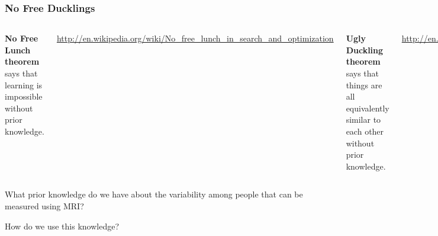 \begin{frame}
\frametitle{No Free Ducklings}
\begin{columns}[c]
{\bf No Free Lunch theorem} says that learning is impossible without prior knowledge.\\
\begin{tiny}
\url{http://en.wikipedia.org/wiki/No\_free\_lunch\_in\_search\_and\_optimization}\par
\end{tiny}
\vspace{0.25cm}

{\bf Ugly Duckling theorem} says that things are all equivalently similar to each other without prior knowledge.
\begin{tiny} 
\url{http://en.wikipedia.org/wiki/Ugly\_duckling\_theorem}\par
\end{tiny}
\includegraphics[width=\textwidth]{Ready}
{\fontsize{0.12cm}{0.1em}\selectfont
By Ryan Ebert from Portland, US (Flickr) [CC BY 2.0], via Wikimedia Commons.
https://creativecommons.org/licenses/by/2.0/\par
}
\end{columns}
\vspace{1cm}
What prior knowledge do we have about the variability among people that can be measured using MRI?

How do we use this knowledge?
\end{frame}

